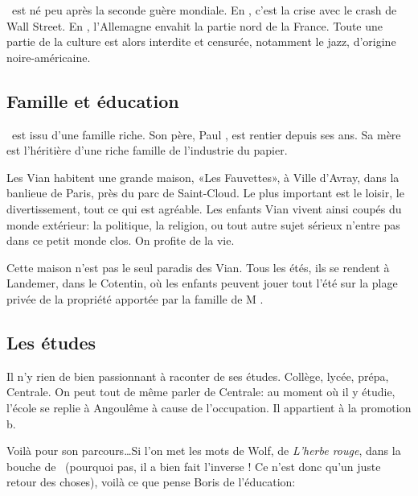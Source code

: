 \BV\ est né peu après la seconde guère mondiale. En , c'est
la crise avec le crash de Wall Street. En , l'Allemagne envahit la
partie nord de la France. Toute une partie de la culture est alors
interdite et censurée, notamment le jazz, d'origine noire-américaine.

\subsection{Famille et éducation}

\BV \ est issu d'une famille riche. Son père, Paul , est rentier
depuis ses  ans. Sa mère est l'héritière d'une riche famille de l'industrie
du papier.

Les Vian habitent une grande maison, «Les Fauvettes», à Ville d'Avray, dans la
banlieue de Paris, près du parc de Saint-Cloud. Le plus important est le loisir,
le divertissement, tout ce qui est agréable. Les enfants Vian vivent ainsi coupés
du monde extérieur: la politique, la religion, ou tout autre sujet sérieux n'entre
pas dans ce petit monde clos. On profite de la vie.

Cette maison n'est pas le seul paradis des Vian. Tous les étés, ils se rendent
à Landemer, dans le Cotentin, où les enfants peuvent jouer tout l'été sur la
plage privée de la propriété apportée par la famille de  M . 

\subsection{Les études}
Il n'y rien de bien passionnant à raconter de ses études. Collège, lycée, prépa, Centrale.
On peut tout de même parler de Centrale: au moment où il y étudie, l'école
se replie à Angoulême à cause de l'occupation. Il appartient à la promotion b.

Voilà pour son parcours\ldots Si l'on met les mots de Wolf, de \emph{L'herbe rouge},
dans la bouche de \BV\ (pourquoi pas, il a bien fait l'inverse ! Ce n'est donc qu'un
juste retour des choses), voilà ce que pense Boris de l'éducation:


